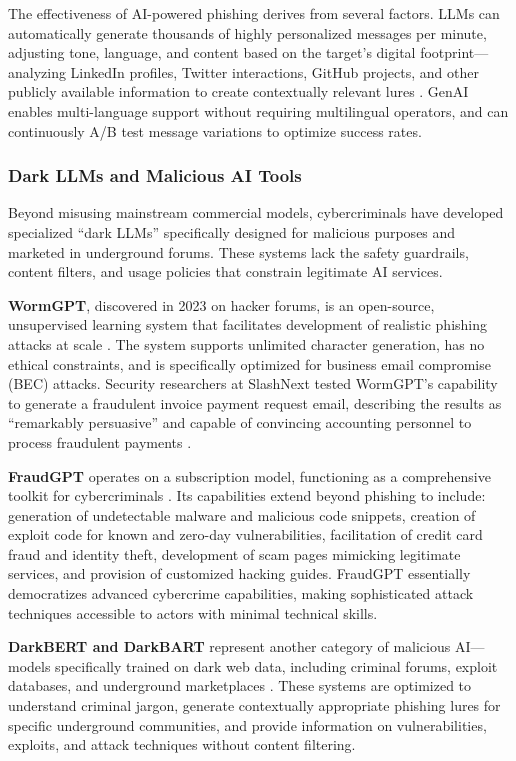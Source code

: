 The effectiveness of AI-powered phishing derives from several factors. LLMs can automatically generate thousands of highly personalized messages per minute, adjusting tone, language, and content based on the target's digital footprint---analyzing LinkedIn profiles, Twitter interactions, GitHub projects, and other publicly available information to create contextually relevant lures \cite{reddit2025}. GenAI enables multi-language support without requiring multilingual operators, and can continuously A/B test message variations to optimize success rates.

\subsubsection{Dark LLMs and Malicious AI Tools}

Beyond misusing mainstream commercial models, cybercriminals have developed specialized ``dark LLMs'' specifically designed for malicious purposes and marketed in underground forums. These systems lack the safety guardrails, content filters, and usage policies that constrain legitimate AI services.

\textbf{WormGPT}, discovered in 2023 on hacker forums, is an open-source, unsupervised learning system that facilitates development of realistic phishing attacks at scale \cite{scadafence2024}. The system supports unlimited character generation, has no ethical constraints, and is specifically optimized for business email compromise (BEC) attacks. Security researchers at SlashNext tested WormGPT's capability to generate a fraudulent invoice payment request email, describing the results as ``remarkably persuasive'' and capable of convincing accounting personnel to process fraudulent payments \cite{eftsure2025}.

\textbf{FraudGPT} operates on a subscription model, functioning as a comprehensive toolkit for cybercriminals \cite{scadafence2024}. Its capabilities extend beyond phishing to include: generation of undetectable malware and malicious code snippets, creation of exploit code for known and zero-day vulnerabilities, facilitation of credit card fraud and identity theft, development of scam pages mimicking legitimate services, and provision of customized hacking guides. FraudGPT essentially democratizes advanced cybercrime capabilities, making sophisticated attack techniques accessible to actors with minimal technical skills.

\textbf{DarkBERT and DarkBART} represent another category of malicious AI---models specifically trained on dark web data, including criminal forums, exploit databases, and underground marketplaces \cite{darkllms2023}. These systems are optimized to understand criminal jargon, generate contextually appropriate phishing lures for specific underground communities, and provide information on vulnerabilities, exploits, and attack techniques without content filtering.

